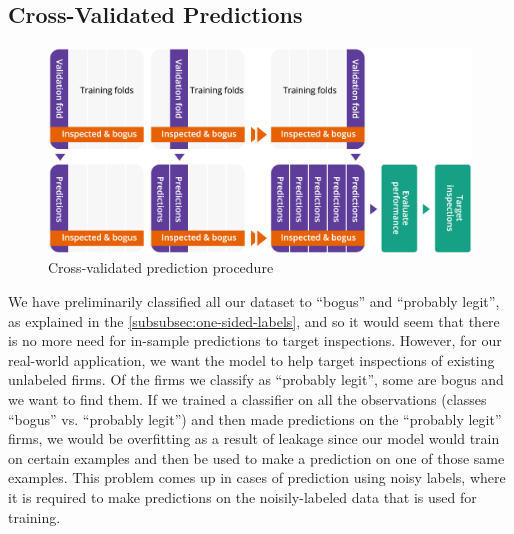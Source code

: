 \subsection{Cross-Validated Predictions}
\label{subsec:cvp}
\begin{figure}
  \includegraphics[width=1\columnwidth]{figures/CrossValidatedPrediction.png}
  \caption{Cross-validated prediction procedure}
  \label{fig:crossvalidation}
\end{figure}

We have preliminarily classified all our dataset to ``bogus'' and ``probably legit'', as explained in the \cref{subsubsec:one-sided-labels}, and so it would seem that there is no more need for in-sample predictions to target inspections. However, for our real-world application, we want the model to help target inspections of existing unlabeled firms. Of the firms we classify as ``probably legit'', some are bogus and we want to find them. If we trained a classifier on all the observations (classes ``bogus'' vs. ``probably legit'') and then made predictions on the ``probably legit'' firms, we would be overfitting as a result of leakage since our model would train on certain examples and then be used to make a prediction on one of those same examples. This problem comes up in cases of prediction using noisy labels, where it is required to make predictions on the noisily-labeled data that is used for training.

